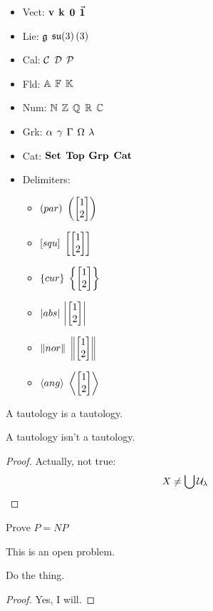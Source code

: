 \documentclass[11pt]{article}
\begin{document}
\mkPsetTitle{}

\begin{itemize}
    \item Vect: $\mathbf{v}$ $\mathbf{k}$ $\mathbf{0}$ $\vec{\mathbf{1}}$
    \item Lie: $\mathfrak{g}$ $\mathfrak{s}\mathfrak{u}(3)\left(3\right)$
    \item Cal: $\mathcal{C}$ $\mathcal{D}$ $\mathcal{P}$
    \item Fld: $\mathbb{A}$ $\mathbb{F}$ $\mathbb{K}$
    \item Num: $\mathbb{N}$ $\mathbb{Z}$ $\mathbb{Q}$ $\mathbb{R}$ $\mathbb{C}$
    \item Grk: $\alpha$ $\gamma$ $\Gamma$ $\Omega$ $\lambda$
    \item Cat: $\mathbf{Set}$ $\mathbf{Top}$ $\mathbf{Grp}$ $\mathbf{Cat}$
    \item Delimiters:
    \begin{itemize}
        \newcommand{\tallthing}{\begin{bmatrix}1\\2\end{bmatrix}}
        \item $\left(par\right)$ $\Par{\tallthing}$
        \item $\left[squ\right]$ $\Squ{\tallthing}$
        \item $\left\{cur\right\}$ $\Cur{\tallthing}$
        \item $\left|abs\right|$ $\Abs{\tallthing}$ 
        \item $\left\Vert nor\right\Vert$ $\Nor{\tallthing}$
        \item $\left\langle ang\right\rangle$ $\Ang{\tallthing}$
    \end{itemize}
\end{itemize}

\begin{thm}
    A tautology is a tautology.    
\end{thm}

\begin{thm*}
    A tautology isn't a tautology.    
\end{thm*}
\begin{proof}
    Actually, not true:
    \[
        X \neq \bigcup \mathcal{U}_\lambda
    \]
\end{proof}

\begin{exer}
    Prove $P = NP$
\end{exer}
\begin{sol}
    This is an open problem.
\end{sol}


\begin{psetProblem}
    Do the thing.
    \begin{proof}
        Yes, I will.
    \end{proof}
\end{psetProblem}
\end{document}
